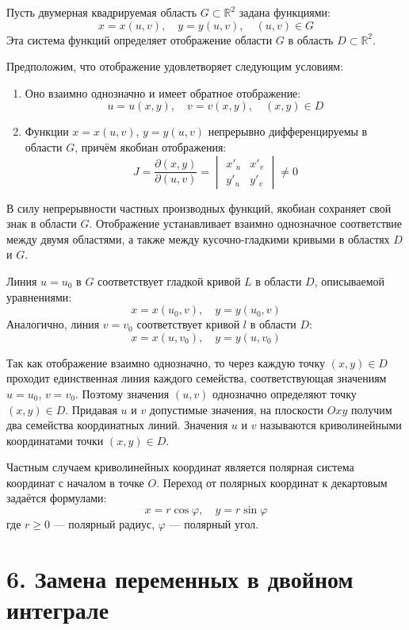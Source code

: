\documentclass[17pt,a4paper]{extreport}
\begin{document}
Пусть двумерная квадрируемая область $G \subset \mathbb{R}^2$ задана функциями:
\[
x = x(u,v), \quad y = y(u,v), \quad (u,v) \in G
\]
Эта система функций определяет отображение области $G$ в область $D \subset \mathbb{R}^2$.

Предположим, что отображение удовлетворяет следующим условиям:
\begin{enumerate}
\item Оно взаимно однозначно и имеет обратное отображение:
  \[
  u = u(x,y), \quad v = v(x,y), \quad (x,y) \in D
  \]
\item Функции $x = x(u,v)$, $y = y(u,v)$ непрерывно дифференцируемы в области $G$, причём якобиан отображения:
  \[
  J = \frac{\partial(x,y)}{\partial(u,v)} = 
  \begin{vmatrix}
  x'_u & x'_v \\
  y'_u & y'_v
  \end{vmatrix} \neq 0
  \]
\end{enumerate}

В силу непрерывности частных производных функций, якобиан сохраняет свой знак в области $G$. Отображение устанавливает взаимно однозначное соответствие между двумя областями, а также между кусочно-гладкими кривыми в областях $D$ и $G$.

Линия $u = u_0$ в $G$ соответствует гладкой кривой $L$ в области $D$, описываемой уравнениями:
\[
x = x(u_0, v), \quad y = y(u_0, v)
\]
Аналогично, линия $v = v_0$ соответствует кривой $l$ в области $D$:
\[
x = x(u, v_0), \quad y = y(u, v_0)
\]

Так как отображение взаимно однозначно, то через каждую точку $(x,y) \in D$ проходит единственная линия каждого семейства, соответствующая значениям $u = u_0$, $v = v_0$. Поэтому значения $(u,v)$ однозначно определяют точку $(x,y) \in D$. Придавая $u$ и $v$ допустимые значения, на плоскости $Oxy$ получим два семейства координатных линий. Значения $u$ и $v$ называются криволинейными координатами точки $(x,y) \in D$.

Частным случаем криволинейных координат является полярная система координат с началом в точке $O$. Переход от полярных координат к декартовым задаётся формулами:
\[
x = r\cos\varphi, \quad y = r\sin\varphi
\]
где $r \geq 0$ --- полярный радиус, $\varphi$ --- полярный угол.

\newpage

\section{6. Замена переменных в двойном интеграле}
\end{document}
